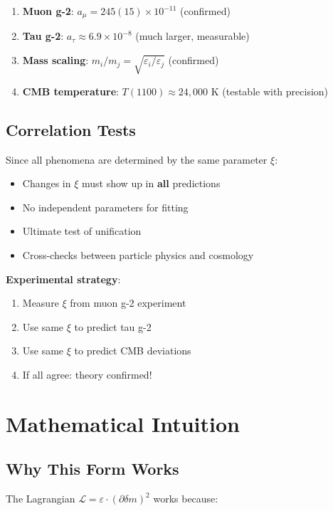 \documentclass[12pt,a4paper]{article}
\newcommand{\deltam}{\delta m}
\newcommand{\Lag}{\mathcal{L}}
\newcommand{\xipar}{\xi}
\theoremstyle{definition}
\theoremstyle{remark}
\begin{document}
	\begin{enumerate}
		\item \textbf{Muon g-2}: $a_{\mu} = 245(15) \times 10^{-11}$ \checkmark (confirmed)
		\item \textbf{Tau g-2}: $a_{\tau} \approx 6.9 \times 10^{-8}$ (much larger, measurable)
		\item \textbf{Mass scaling}: $m_i/m_j = \sqrt{\varepsilon_i/\varepsilon_j}$ \checkmark (confirmed)
		\item \textbf{CMB temperature}: $T(1100) \approx 24{,}000$ K (testable with precision)
	\end{enumerate}
	
	\subsection{Correlation Tests}
	
	Since all phenomena are determined by the same parameter $\xipar$:
	
	\begin{itemize}
		\item Changes in $\xipar$ must show up in \textbf{all} predictions
		\item No independent parameters for fitting
		\item Ultimate test of unification
		\item Cross-checks between particle physics and cosmology
	\end{itemize}
	
	\textbf{Experimental strategy}:
	\begin{enumerate}
		\item Measure $\xipar$ from muon g-2 experiment
		\item Use same $\xipar$ to predict tau g-2
		\item Use same $\xipar$ to predict CMB deviations
		\item If all agree: theory confirmed!
	\end{enumerate}
	
	\section{Mathematical Intuition}
	
	\subsection{Why This Form Works}
	
	The Lagrangian $\Lag = \varepsilon \cdot (\partial \deltam)^2$ works because:
	
\end{document}

